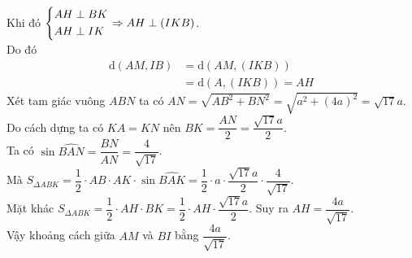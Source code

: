 \begin{ex}
{\noindent
	Khi đó  $\left\{\begin{aligned}&AH\perp BK\\&AH\perp IK\end{aligned}\right.\Rightarrow AH\perp \left(IKB\right)$.\\	
	Do đó 
	\begin{align*}
	\mathrm{d}\left(AM, IB\right) &= \mathrm{d}\left(AM, \left(IKB\right)\right)\\ 
	&= \mathrm{d}\left(A, \left(IKB\right)\right) = AH
	\end{align*}
Xét tam giác vuông $ABN$ ta có $AN = \sqrt{AB^2 + BN^2} = \sqrt{a^2 + \left(4a\right)^2} = \sqrt{17}a$.\\
Do cách dựng ta có $KA = KN$ nên $BK = \dfrac{AN}{2} = \dfrac{\sqrt{17}a}{2}$.\\
Ta có $\sin\widehat{BAN} = \dfrac{BN}{AN} = \dfrac{4}{\sqrt{17}}$.\\
 Mà $S_{\Delta ABK} = \dfrac{1}{2}\cdot AB\cdot AK\cdot \sin\widehat{BAK} = \dfrac{1}{2}\cdot a\cdot \dfrac{\sqrt{17}a}{2}\cdot \dfrac{4}{\sqrt{17}}$.\\
 Mặt khác 	$S_{\Delta ABK} = \dfrac{1}{2}\cdot AH\cdot BK = \dfrac{1}{2}\cdot AH\cdot \dfrac{\sqrt{17}a}{2}$. Suy ra $AH = \dfrac{4a}{\sqrt{17}}$.\\
 Vậy khoảng cách giữa $AM$ và $BI$ bằng $\dfrac{4a}{\sqrt{17}}$.
		
	}
\end{ex}

